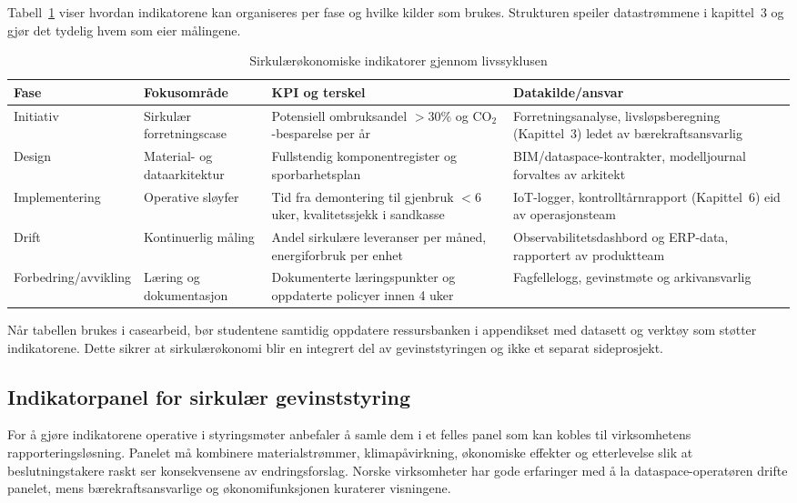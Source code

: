Tabell~\ref{tab:sirkular-livssyklus} viser hvordan indikatorene kan organiseres per fase og hvilke kilder som brukes. Strukturen speiler datastrømmene i kapittel~3 og gjør det tydelig hvem som eier målingene.

\begin{table}[h]
    \centering
    \caption{Sirkulærøkonomiske indikatorer gjennom livssyklusen}
    \label{tab:sirkular-livssyklus}
    \begin{tabular}{p{2.7cm}p{3.7cm}p{3.5cm}p{3.0cm}}
        \toprule
        Fase & Fokusområde & KPI og terskel & Datakilde/ansvar \\
        \midrule
        Initiativ & Sirkulær forretningscase & Potensiell ombruksandel $>30\%$ og CO$_2$-besparelse per år & Forretningsanalyse, livsløpsberegning (Kapittel~3) ledet av bærekraftsansvarlig \\
        Design & Material- og dataarkitektur & Fullstendig komponentregister og sporbarhetsplan & BIM/dataspace-kontrakter, modelljournal forvaltes av arkitekt \\
        Implementering & Operative sløyfer & Tid fra demontering til gjenbruk $<6$ uker, kvalitetssjekk i sandkasse & IoT-logger, kontrolltårnrapport (Kapittel~6) eid av operasjonsteam \\
        Drift & Kontinuerlig måling & Andel sirkulære leveranser per måned, energiforbruk per enhet & Observabilitetsdashbord og ERP-data, rapportert av produktteam \\
        Forbedring/avvikling & Læring og dokumentasjon & Dokumenterte læringspunkter og oppdaterte policyer innen 4 uker & Fagfellelogg, gevinstmøte og arkivansvarlig \\
        \bottomrule
    \end{tabular}
\end{table}

Når tabellen brukes i casearbeid, bør studentene samtidig oppdatere ressursbanken i appendikset med datasett og verktøy som støtter indikatorene. Dette sikrer at sirkulærøkonomi blir en integrert del av gevinststyringen og ikke et separat sideprosjekt.

\subsection*{Indikatorpanel for sirkulær gevinststyring}
For å gjøre indikatorene operative i styringsmøter anbefaler \citet{miljodir2024indikatorveileder} å samle dem i et felles panel som kan kobles til virksomhetens rapporteringsløsning. Panelet må kombinere materialstrømmer, klimapåvirkning, økonomiske effekter og etterlevelse slik at beslutningstakere raskt ser konsekvensene av endringsforslag. Norske virksomheter har gode erfaringer med å la dataspace-operatøren drifte panelet, mens bærekraftsansvarlige og økonomifunksjonen kuraterer visningene.\citep{dfo2023baerekraft,hydro2023traceability}

